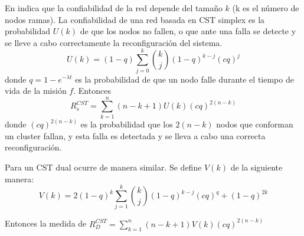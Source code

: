 En \cite{Tai99} indica que la confiabilidad de la red depende del tamaño $k$ (k es el número de nodos ramas). La confiabilidad de una red basada en \ac{CST} simplex es la probabilidad $U(k)$ de que los nodos no fallen, o que ante una falla se detecte y se lleve a cabo correctamente la reconfiguración del sistema. $$U(k) = (1-q) \sum_{j=0}^{k} {{k}\choose{j}} (1-q)^{k-j} (cq)^j $$ donde $q = 1-e^{-\lambda t}$ es la probabilidad de que un nodo falle durante el tiempo de vida de la misión $f$. Entonces $$R_s^{CST} = \sum_{k=1}^n (n-k+1)U(k)(cq)^{2(n-k)}$$ donde $(cq)^{2(n-k)}$ es la probabilidad que los  $2(n-k)$ nodos que conforman un cluster fallan, y esta falla es detectada y se lleva a cabo una correcta reconfiguración.

Para un \ac{CST} dual ocurre de manera similar. Se define $V(k)$ de la siguiente manera: $$V(k) = 2(1-q)^k \sum_{j=1}^k {{k}\choose{j}} (1-q)^{k-j} (cq)^q + (1-q)^{2k}$$

Entonces la medida de $R_D^{CST} =  \sum_{k=1}^n (n-k+1) V(k) (cq)^{2(n-k)}$
